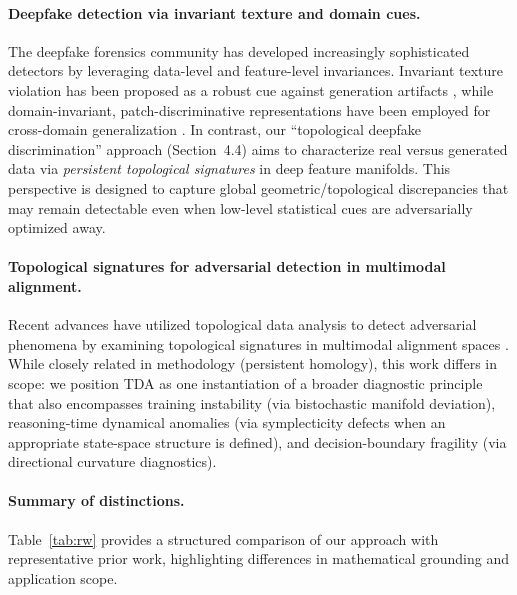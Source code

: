 \documentclass[11pt]{article}
\begin{document}
\paragraph{Deepfake detection via invariant texture and domain cues.}
The deepfake forensics community has developed increasingly sophisticated detectors by leveraging data-level and feature-level invariances. Invariant texture violation has been proposed as a robust cue against generation artifacts \cite{sun2020invariant}, while domain-invariant, patch-discriminative representations have been employed for cross-domain generalization \cite{zhang2024domain}. In contrast, our ``topological deepfake discrimination'' approach (Section~4.4) aims to characterize real versus generated data via \emph{persistent topological signatures} in deep feature manifolds. This perspective is designed to capture global geometric/topological discrepancies that may remain detectable even when low-level statistical cues are adversarially optimized away.

\paragraph{Topological signatures for adversarial detection in multimodal alignment.}
Recent advances have utilized topological data analysis to detect adversarial phenomena by examining topological signatures in multimodal alignment spaces \cite{vu2025topological}. While closely related in methodology (persistent homology), this work differs in scope: we position TDA as one instantiation of a broader diagnostic principle that also encompasses training instability (via bistochastic manifold deviation), reasoning-time dynamical anomalies (via symplecticity defects when an appropriate state-space structure is defined), and decision-boundary fragility (via directional curvature diagnostics).

\paragraph{Summary of distinctions.}
Table~\ref{tab:rw} provides a structured comparison of our approach with representative prior work, highlighting differences in mathematical grounding and application scope.
\end{document}
